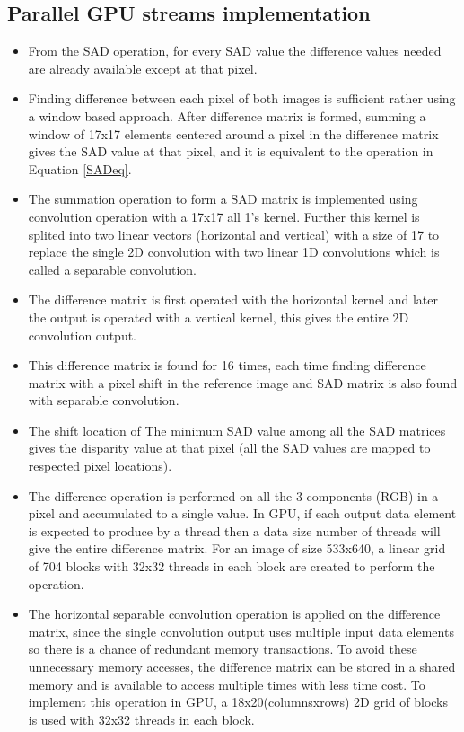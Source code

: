 \subsection{Parallel GPU streams implementation}
\begin{itemize}
	\item From the SAD operation, for every SAD value the difference values needed are already available except at that pixel. 
	\item Finding difference between each pixel of both images is sufficient rather using a window based approach. After difference matrix is formed, summing a window of 17x17 elements centered around a pixel in the difference matrix gives the SAD value at that pixel, and it is equivalent to the operation in Equation \ref{SADeq}.
	\item The summation operation to form a SAD matrix is implemented using convolution operation with a 17x17 all 1's kernel. Further this kernel is splited into two linear vectors (horizontal and vertical) with a size of 17 to replace the single 2D convolution with two linear 1D convolutions which is called a separable convolution.
	\item The difference matrix is first operated with the horizontal kernel and later the output is operated with a vertical kernel, this gives the entire 2D convolution output.
	\item This difference matrix is found for 16 times, each time finding difference matrix with a pixel shift in the reference image and SAD matrix is also found with separable convolution.
	\item The shift location of The minimum SAD value among all the SAD matrices gives the disparity value at that pixel (all the SAD values are mapped to respected pixel locations).
	\item The difference operation is performed on all the 3 components (RGB) in a pixel and accumulated to a single value. In GPU, if each output data element is expected to produce by a thread then a data size number of threads will give the entire difference matrix. For an image of size 533x640, a linear grid of 704 blocks with 32x32 threads in each block are created to perform the operation.
	\item The horizontal separable convolution operation is applied on the difference matrix, since the single convolution output uses multiple input data elements so there is a chance of redundant memory transactions. To avoid these unnecessary memory accesses, the difference matrix can be stored in a shared memory and is available to access multiple times with less time cost. To implement this operation in GPU, a 18x20(columnsxrows) 2D grid of blocks is used with 32x32 threads in each block.

\end{itemize}
